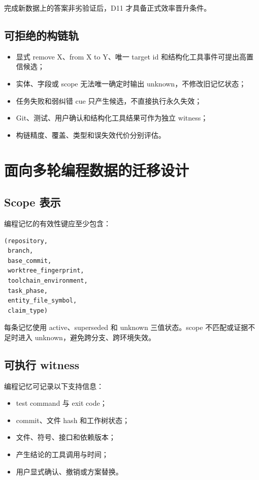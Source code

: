 完成新数据上的答案非劣验证后，D11 才具备正式效率晋升条件。

\subsection{可拒绝的构链轨}

\begin{itemize}
\item 显式 remove X、from X to Y、唯一 target id 和结构化工具事件可提出高置信候选；
\item 实体、字段或 scope 无法唯一确定时输出 unknown，不修改旧记忆状态；
\item 任务失败和弱纠错 cue 只产生候选，不直接执行永久失效；
\item Git、测试、用户确认和结构化工具结果可作为独立 witness；
\item 构链精度、覆盖、类型和误失效代价分别评估。
\end{itemize}

\section{面向多轮编程数据的迁移设计}

\subsection{Scope 表示}

编程记忆的有效性键应至少包含：

\begin{Verbatim}[fontsize=\small]
(repository,
 branch,
 base_commit,
 worktree_fingerprint,
 toolchain_environment,
 task_phase,
 entity_file_symbol,
 claim_type)
\end{Verbatim}

每条记忆使用 active、superseded 和 unknown 三值状态。scope 不匹配或证据不足时进入 unknown，避免跨分支、跨环境失效。

\subsection{可执行 witness}

编程记忆可记录以下支持信息：

\begin{itemize}
\item test command 与 exit code；
\item commit、文件 hash 和工作树状态；
\item 文件、符号、接口和依赖版本；
\item 产生结论的工具调用与时间；
\item 用户显式确认、撤销或方案替换。
\end{itemize}


